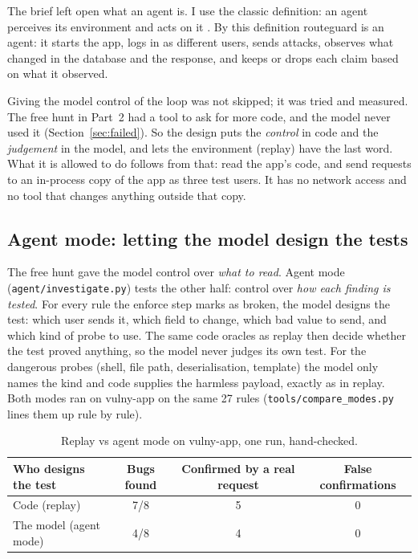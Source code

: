 \documentclass[11pt,a4paper]{article}
\newcommand{\code}[1]{\texttt{#1}}
\begin{document}
The brief left open what an agent is. I use the classic definition: an agent perceives its environment and
acts on it \cite{aima}. By this definition routeguard is an agent: it starts the app, logs in as different users,
sends attacks, observes what changed in the database and the response, and keeps or drops each claim based on what
it observed.

Giving the model control of the loop was not skipped; it was tried and measured. The free hunt in Part~2 had a
tool to ask for more code, and the model never used it (Section~\ref{sec:failed}). So the design puts the
\emph{control} in code and the \emph{judgement} in the model, and lets the environment (replay) have the last word.
What it is allowed to do follows from that: read the app's code, and send requests to an in-process copy of the
app as three test users. It has no network access and no tool that changes anything outside that copy.

\subsection{Agent mode: letting the model design the tests}
\label{sec:agentmode}

The free hunt gave the model control over \emph{what to read}. Agent mode (\code{agent/investigate.py}) tests the
other half: control over \emph{how each finding is tested}. For every rule the enforce step marks as broken, the model
designs the test: which user sends it, which field to change, which bad value to send, and which kind of probe to use.
The same code oracles as replay then decide whether the test proved anything, so the model never judges its own
test. For the dangerous probes (shell, file path, deserialisation, template) the model only names the kind and code
supplies the harmless payload, exactly as in replay. Both modes ran on vulny-app on the same 27 rules
(\code{tools/compare\_modes.py} lines them up rule by rule).

\begin{table}[H]
\centering
\caption{Replay vs agent mode on vulny-app, one run, hand-checked.}
\begin{tabularx}{\linewidth}{@{}Y c c c@{}}
\toprule
\textbf{Who designs the test} & \textbf{Bugs found} & \textbf{Confirmed by a real request} & \textbf{False confirmations} \\
\midrule
Code (replay) & 7/8 & 5 & 0 \\
The model (agent mode) & 4/8 & 4 & 0 \\
\bottomrule
\end{tabularx}
\end{table}
\end{document}
